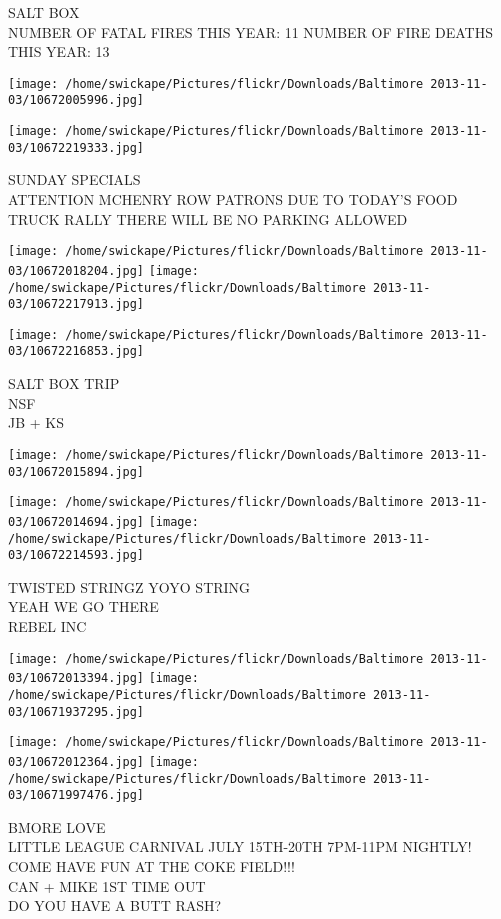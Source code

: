 \documentclass[10pt,letterpaper]{article}
\begin{document}
SALT BOX\\
NUMBER OF FATAL FIRES THIS YEAR: 11 NUMBER OF FIRE DEATHS THIS YEAR: 13
\pagebreak

\texttt{[image: /home/swickape/Pictures/flickr/Downloads/Baltimore 2013-11-03/10672005996.jpg]}

\vspace{0.25in}
\texttt{[image: /home/swickape/Pictures/flickr/Downloads/Baltimore 2013-11-03/10672219333.jpg]}

SUNDAY SPECIALS\\
ATTENTION MCHENRY ROW PATRONS DUE TO TODAY'S FOOD TRUCK RALLY THERE WILL BE NO PARKING ALLOWED
\pagebreak

\texttt{[image: /home/swickape/Pictures/flickr/Downloads/Baltimore 2013-11-03/10672018204.jpg]}
\texttt{[image: /home/swickape/Pictures/flickr/Downloads/Baltimore 2013-11-03/10672217913.jpg]}

\vspace{0.25in}
\texttt{[image: /home/swickape/Pictures/flickr/Downloads/Baltimore 2013-11-03/10672216853.jpg]}

SALT BOX TRIP\\
NSF\\
JB + KS
\pagebreak

\texttt{[image: /home/swickape/Pictures/flickr/Downloads/Baltimore 2013-11-03/10672015894.jpg]}

\vspace{0.25in}
\texttt{[image: /home/swickape/Pictures/flickr/Downloads/Baltimore 2013-11-03/10672014694.jpg]}
\texttt{[image: /home/swickape/Pictures/flickr/Downloads/Baltimore 2013-11-03/10672214593.jpg]}

TWISTED STRINGZ YOYO STRING\\
YEAH WE GO THERE\\
REBEL INC
\pagebreak

\texttt{[image: /home/swickape/Pictures/flickr/Downloads/Baltimore 2013-11-03/10672013394.jpg]}
\texttt{[image: /home/swickape/Pictures/flickr/Downloads/Baltimore 2013-11-03/10671937295.jpg]}

\texttt{[image: /home/swickape/Pictures/flickr/Downloads/Baltimore 2013-11-03/10672012364.jpg]}
\texttt{[image: /home/swickape/Pictures/flickr/Downloads/Baltimore 2013-11-03/10671997476.jpg]}

BMORE LOVE\\
LITTLE LEAGUE CARNIVAL JULY 15TH{-}20TH 7PM{-}11PM NIGHTLY! COME HAVE FUN AT THE COKE FIELD!!!\\
CAN + MIKE 1ST TIME OUT\\
DO YOU HAVE A BUTT RASH?
\pagebreak
\end{document}
